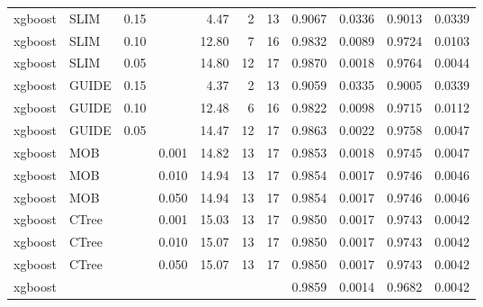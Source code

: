 \begin{table}[!htb]
\begin{tabular}[t]{l|l|r|r|r|r|r|r|r|r|r}
xgboost & SLIM & 0.15 & & 4.47 & 2 & 13 & 0.9067 & 0.0336 & 0.9013 & 0.0339\\
xgboost & SLIM & 0.10 & & 12.80 & 7 & 16 & 0.9832 & 0.0089 & 0.9724 & 0.0103\\
xgboost & SLIM & 0.05 & & 14.80 & 12 & 17 & 0.9870 & 0.0018 & 0.9764 & 0.0044\\
xgboost & GUIDE & 0.15 & & 4.37 & 2 & 13 & 0.9059 & 0.0335 & 0.9005 & 0.0339\\
xgboost & GUIDE & 0.10 & & 12.48 & 6 & 16 & 0.9822 & 0.0098 & 0.9715 & 0.0112\\
xgboost & GUIDE & 0.05 & & 14.47 & 12 & 17 & 0.9863 & 0.0022 & 0.9758 & 0.0047\\
xgboost & MOB & & 0.001 & 14.82 & 13 & 17 & 0.9853 & 0.0018 & 0.9745 & 0.0047\\
xgboost & MOB & & 0.010 & 14.94 & 13 & 17 & 0.9854 & 0.0017 & 0.9746 & 0.0046\\
xgboost & MOB & & 0.050 & 14.94 & 13 & 17 & 0.9854 & 0.0017 & 0.9746 & 0.0046\\
xgboost & CTree & & 0.001 & 15.03 & 13 & 17 & 0.9850 & 0.0017 & 0.9743 & 0.0042\\
xgboost & CTree & & 0.010 & 15.07 & 13 & 17 & 0.9850 & 0.0017 & 0.9743 & 0.0042\\
xgboost & CTree & & 0.050 & 15.07 & 13 & 17 & 0.9850 & 0.0017 & 0.9743 & 0.0042\\
\hline
xgboost & & & & & & & 0.9859 & 0.0014 & 0.9682 & 0.0042\\
\hline
\end{tabular}
\label{tab:app_linear_mixed_1000}

\end{table}





